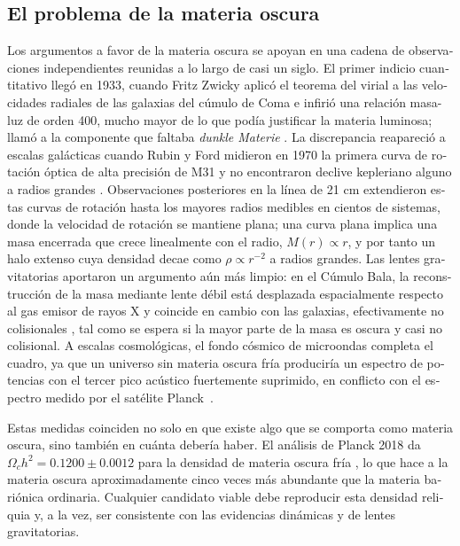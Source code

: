 \begin{otherlanguage}{spanish}
\section*{El problema de la materia oscura}
Los argumentos a favor de la materia oscura se apoyan en una cadena de observaciones independientes reunidas a lo largo de casi un siglo. El primer indicio cuantitativo llegó en 1933, cuando Fritz Zwicky aplicó el teorema del virial a las velocidades radiales de las galaxias del cúmulo de Coma e infirió una relación masa-luz de orden 400, mucho mayor de lo que podía justificar la materia luminosa; llamó a la componente que faltaba \emph{dunkle Materie} \cite{Zwicky:1933}. La discrepancia reapareció a escalas galácticas cuando Rubin y Ford midieron en 1970 la primera curva de rotación óptica de alta precisión de M31 y no encontraron declive kepleriano alguno a radios grandes \cite{Rubin:1970zza}. Observaciones posteriores en la línea de 21 cm extendieron estas curvas de rotación hasta los mayores radios medibles en cientos de sistemas, donde la velocidad de rotación se mantiene plana; una curva plana implica una masa encerrada que crece linealmente con el radio, $M(r) \propto r$, y por tanto un halo extenso cuya densidad decae como $\rho \propto r^{-2}$ a radios grandes. Las lentes gravitatorias aportaron un argumento aún más limpio: en el Cúmulo Bala, la reconstrucción de la masa mediante lente débil está desplazada espacialmente respecto al gas emisor de rayos X y coincide en cambio con las galaxias, efectivamente no colisionales \cite{Clowe:2006eq}, tal como se espera si la mayor parte de la masa es oscura y casi no colisional. A escalas cosmológicas, el fondo cósmico de microondas completa el cuadro, ya que un universo sin materia oscura fría produciría un espectro de potencias con el tercer pico acústico fuertemente suprimido, en conflicto con el espectro medido por el satélite Planck~\cite{Aghanim:2018eyx}.

Estas medidas coinciden no solo en que existe algo que se comporta como materia oscura, sino también en cuánta debería haber. El análisis de Planck 2018 da $\Omega_c h^2 = 0.1200 \pm 0.0012$ para la densidad de materia oscura fría \cite{Aghanim:2018eyx}, lo que hace a la materia oscura aproximadamente cinco veces más abundante que la materia bariónica ordinaria. Cualquier candidato viable debe reproducir esta densidad reliquia y, a la vez, ser consistente con las evidencias dinámicas y de lentes gravitatorias.


\end{otherlanguage}
